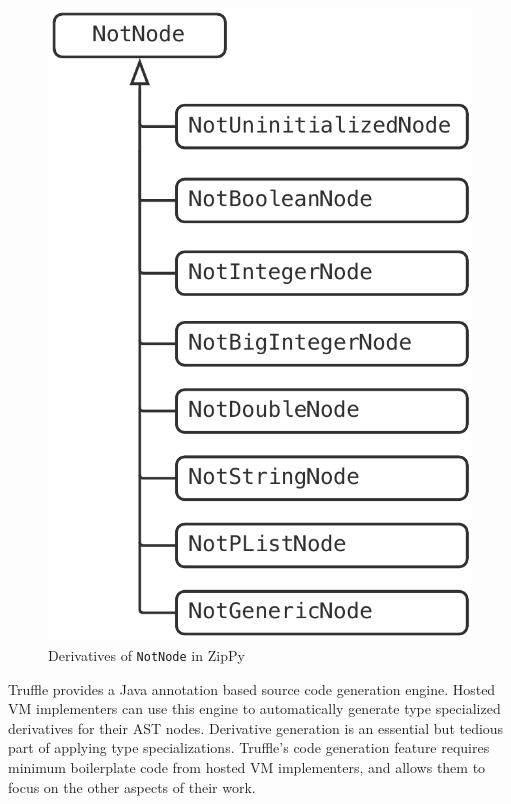 \begin{figure}[t]
\centering
\includegraphics[scale=.5]{figures/ch3-not-node-derivatives.pdf}
\caption{Derivatives of \texttt{NotNode} in ZipPy}
\label{fig:not-node-derivatives}
\end{figure}

Truffle provides a Java annotation based source code generation engine.
Hosted VM implementers can use this engine to automatically generate type specialized derivatives for their AST nodes.
Derivative generation is an essential but tedious part of applying type specializations.
Truffle's code generation feature requires minimum boilerplate code from hosted VM implementers, and allows them to focus on the other aspects of their work.

